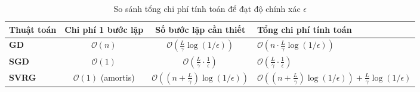 












\begin{table}[H]
\centering

\caption{So sánh tổng chi phí tính toán để đạt độ chính xác $\epsilon$}
\label{tab:complexity_compare}
\small %
\begin{tabularx}{\textwidth}{l c c X}
\toprule
\textbf{Thuật toán} & \textbf{Chi phí 1 bước lặp} & \textbf{Số bước lặp cần thiết} & \textbf{Tổng chi phí tính toán} \\ 
\midrule
\textbf{GD}  & $\mathcal{O}(n)$ & $\mathcal{O}\left(\frac{L}{\gamma}\log(1/\epsilon)\right)$ & $\mathcal{O}\left(n \cdot \frac{L}{\gamma}\log(1/\epsilon)\right)$ \\ \addlinespace
\textbf{SGD} & $\mathcal{O}(1)$ & $\mathcal{O}\left(\frac{L}{\gamma}\cdot\frac{1}{\epsilon}\right)$ & $\mathcal{O}\left(\frac{L}{\gamma}\cdot\frac{1}{\epsilon}\right)$ \\ \addlinespace
\textbf{SVRG}& $\mathcal{O}(1)$ (amortis) & $\mathcal{O}\left(\left(n + \frac{L}{\gamma}\right)\log(1/\epsilon)\right)$ & $\mathcal{O}\left(\left(n + \frac{L}{\gamma}\right)\log(1/\epsilon)\right) + \frac{L}{\gamma}\log(1/\epsilon)$ \\ 
\bottomrule
\end{tabularx}
\end{table}


